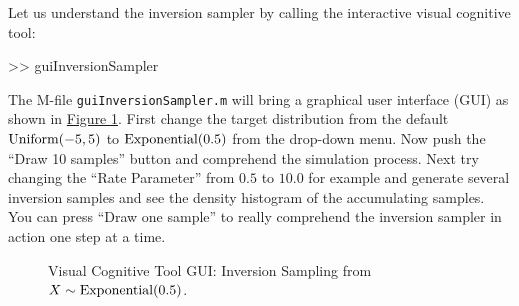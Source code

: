 \begin{labwork}\label{LW:guiInversionSamplerExponential}
Let us understand the inversion sampler by calling the interactive visual cognitive tool:
\begin{VrbM}
>> guiInversionSampler
\end{VrbM}
The M-file {\tt guiInversionSampler.m} will bring a graphical user interface (GUI) as shown in \hyperref[F:guiInversionSamplerExponential]{Figure \ref*{F:guiInversionSamplerExponential}}.  First change the target distribution from the default $\mbox{{\rm Uniform}}(-5,5)$ to $\mbox{{\rm Exponential}}(0.5)$ from the drop-down menu.  Now push the ``Draw 10 samples'' button and comprehend the simulation process.  Next try changing the ``Rate Parameter'' from $0.5$ to $10.0$ for example  and generate several inversion samples and see the density histogram of the accumulating samples.  You can press ``Draw one sample'' to really comprehend the inversion sampler in action one step at a time.
\end{labwork}

\begin{figure}[htpb]
\caption{Visual Cognitive Tool GUI: Inversion Sampling from $X \sim \mbox{{\rm Exponential}}(0.5)$.\label{F:guiInversionSamplerExponential}}
\centering   {}
\end{figure}

